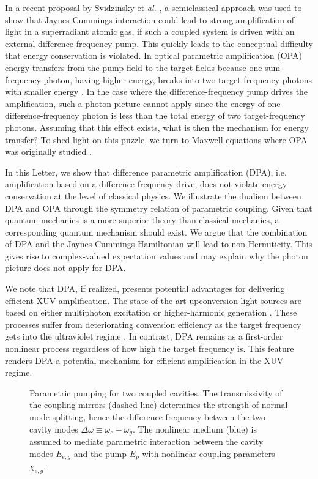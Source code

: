 \documentclass[aps,prl,nobibnotes,nofootinbib,showpacs,reprint]{revtex4-1}
\newcommand{\we}{\omega_{e}}
\newcommand{\wg}{\omega_{g}}
\newcommand{\Dw}{\Delta \omega}
\begin{document}
In a recent proposal by Svidzinsky et \textit{al.} \cite{Svidzinsky1}, a semiclassical approach was used to show that Jaynes-Cummings interaction could lead to strong amplification of light in a superradiant atomic gas, if such a coupled system is driven with an external difference-frequency pump. This quickly leads to the conceptual difficulty that energy conservation is violated. In optical parametric amplification (OPA) energy transfers from the pump field to the target fields because one sum-frequency photon, having higher energy, breaks into two target-frequency photons with smaller energy \cite{Gerry}. In the case where the difference-frequency pump drives the amplification, such a photon picture cannot apply since the energy of one difference-frequency photon is less than the total energy of two target-frequency photons. Assuming that this effect exists, what is then the mechanism for energy transfer? To shed light on this puzzle, we turn to Maxwell equations where OPA was originally studied \cite{Kroll, Tien, Giordmaine}. 

In this Letter, we show that difference parametric amplification (DPA), i.e. amplification based on a difference-frequency drive, does not violate energy conservation at the level of classical physics. We illustrate the dualism between DPA and OPA through the symmetry relation of parametric coupling. Given that quantum mechanics is a more superior theory than classical mechanics, a corresponding quantum mechanism should exist. We argue that the combination of DPA and the Jaynes-Cummings Hamiltonian will lead to non-Hermiticity. This gives rise to complex-valued expectation values and may explain why the photon picture does not apply for DPA. 

We note that DPA, if realized, presents potential advantages for delivering efficient XUV amplification. The state-of-the-art upconversion light sources are based on either multiphoton excitation or higher-harmonic generation \cite{Zhou, Haase, Ghimire}. These processes suffer from deteriorating conversion efficiency as the target frequency gets into the ultraviolet regime \cite{Wang, Ferray, Lein}. In contrast, DPA remains as a first-order nonlinear process regardless of how high the target frequency is. This feature renders DPA a potential mechanism for efficient amplification in the XUV regime.

\begin{figure}[b]
\centering
{}
\caption{Parametric pumping for two coupled cavities. The transmissivity of the coupling mirrors (dashed line) determines the strength of normal mode splitting, hence the difference-frequency between the two cavity modes $\Dw \equiv \we-\wg$. The nonlinear medium (blue) is assumed to mediate parametric interaction between the cavity modes $E_{e,g}$ and the pump $E_{p}$ with nonlinear coupling parameters $\chi_{e,g}$.}
\label{fig:OPO}
\end{figure}
\end{document}
